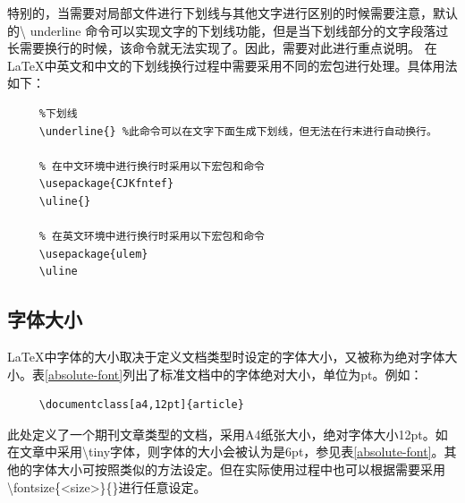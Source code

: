 \documentclass[12pt]{book}
\begin{document}
特别的，当需要对局部文件进行下划线与其他文字进行区别的时候需要注意，默认的\textbackslash
underline
命令可以实现文字的下划线功能，但是当下划线部分的文字段落过长需要换行的时候，该命令就无法实现了。因此，需要对此进行重点说明。
在\LaTeX{}中英文和中文的下划线换行过程中需要采用不同的宏包进行处理。具体用法如下：
\begin{verbatim}
     %下划线
     \underline{} %此命令可以在文字下面生成下划线，但无法在行末进行自动换行。
     
     % 在中文环境中进行换行时采用以下宏包和命令
     \usepackage{CJKfntef} 
     \uline{} 
     
     % 在英文环境中进行换行时采用以下宏包和命令
     \usepackage{ulem}
     \uline
\end{verbatim}


\subsection{字体大小}

\LaTeX{}中字体的大小取决于定义文档类型时设定的字体大小，又被称为绝对字体大小。表\ref{absolute-font}列出了标准文档中的字体绝对大小，单位为pt。例如：
\begin{verbatim}
     \documentclass[a4,12pt]{article} 
\end{verbatim}
此处定义了一个期刊文章类型的文档，采用A4纸张大小，绝对字体大小12pt。如在文章中采用\textbackslash tiny字体，则字体的大小会被认为是6pt，参见表\ref{absolute-font}。其他的字体大小可按照类似的方法设定。但在实际使用过程中也可以根据需要采用\textbackslash fontsize\{<size>\}\{<base line-skip>\}进行任意设定。
\end{document}
